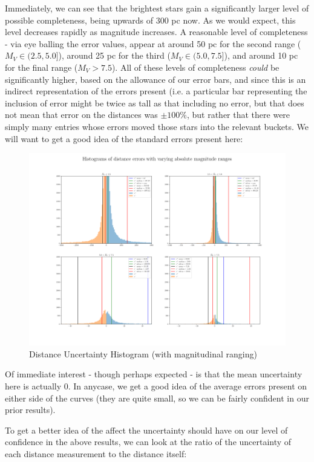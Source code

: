 \documentclass{business-covered} %
\begin{document}
		Immediately, we can see that the brightest stars gain a significantly larger level of possible completeness, being upwards of 300 pc now. As we would expect, this level decreases rapidly as magnitude increases. A reasonable level of completeness - via eye balling the error values, appear at around 50 pc for the second range ($M_V \in (2.5,5.0]$), around 25 pc for the third ($M_V \in (5.0,7.5]$), and around 10 pc for the final range ($M_V > 7.5$). All of these levels of completeness \textit{could} be significantly higher, based on the allowance of our error bars, and since this is an indirect representation of the errors present (i.e. a particular bar representing the inclusion of error might be twice as tall as that including no error, but that does not mean that error on the distances was $\pm 100\%$, but rather that there were simply many entries whose errors moved those stars into the relevant buckets. 
\pagebreak		
		We will want to get a good idea of the standard errors present here:	
		
		\begin{figure}[h!]
			\includegraphics[scale=.33]{figures/e_Dist_hist.png}
			\caption{Distance Uncertainty Histogram (with magnitudinal ranging)}
		\end{figure}

		Of immediate interest - though perhaps expected - is that the mean uncertainty here is actually 0. In anycase, we get a good idea of the average errors present on either side of the curves (they are quite small, so we can be fairly confident in our prior results). 
		
\pagebreak		
		To get a better idea of the affect the uncertainty should have on our level of confidence in the above results, we can look at the ratio of the uncertainty of each distance measurement to the distance itself:
		
\end{document}
